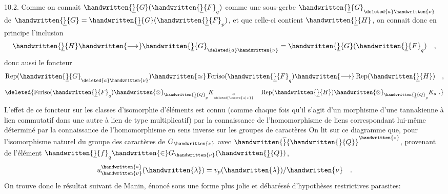10.2. Comme on connait $\handwritten{\underline}{G}(\handwritten{\underline}{F}_q)$ comme une sous-gerbe $\handwritten{\underline}{G}_{\deleted{a}\handwritten{\nu}}$ de $\handwritten{\underline}{G}=\handwritten{\underline}{G}(\handwritten{\underline}{F}_p)$, et que celle-ci contient $\handwritten{\underline}{H}$, on connait donc en principe l'inclusion
\[
\handwritten{\underline}{H}\handwritten{\longrightarrow}\handwritten{\underline}{G}_{\deleted{a}\handwritten{\nu}}=\handwritten{\underline}{G}(\handwritten{\underline}{F}_q)\quad ,
\]
donc aussi le foncteur
\[
\operatorname{Rep}(\handwritten{\underline}{G}_{\deleted{a}\handwritten{\nu}})\handwritten{\simeq}\operatorname{Fcriso}(\handwritten{\underline}{F}_q)\handwritten{\longrightarrow}\operatorname{Rep}(\handwritten{\underline}{H})\quad ,
\]
\[
\deleted{\operatorname{Fcriso}(\handwritten{\underline}{F}_q)\handwritten{\otimes}_{\handwritten{\underline}{Q}_p}K_{\underset{\deleted{\unsure{a|x}}}{a}}\quad\operatorname{Rep}(\handwritten{\underline}{H})\handwritten{\otimes}_{\handwritten{\underline}{Q}_p}K_a\ .}
\]
L'effet de ce foncteur sur les classes d'isomorphie d'éléments est connu (comme chaque fois qu'il s'agit d'un morphisme d'une   tannakienne à lien commutatif dans une autre à lien de type multiplicatif) par la connaissance de l'homomorphisme de liens correspondant
lui-même déterminé par la connaissance de l'homomorphisme en sens inverse sur les groupes de caractères
On lit sur ce diagramme que, pour l'isomorphisme naturel du groupe des caractères de $G_{\handwritten{\nu}}$ avec $\handwritten{\overline}{\handwritten{\underline}{Q}}^{\handwritten{*}}$, provenant de l'élément $\handwritten{\underline}{f}_q\handwritten{\in}G_{\handwritten{\nu}}(\handwritten{\underline}{Q})$,  
\[
u_{\handwritten{\nu}}^{\handwritten{*}}(\handwritten{\lambda})=v_p(\handwritten{\lambda})/\handwritten{\nu}\quad .
\]
On trouve donc le résultat suivant de Manin, énoncé sous une forme plus jolie et débaréssé d'hypothèses restrictives parasites:

